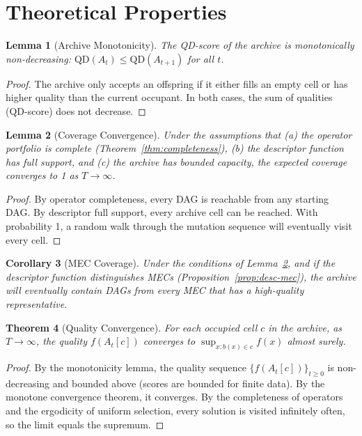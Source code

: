 \documentclass[11pt,a4paper]{article}
\newtheorem{theorem}{Theorem}
\newtheorem{lemma}[theorem]{Lemma}
\newtheorem{corollary}[theorem]{Corollary}
\begin{document}
\section{Theoretical Properties}
\label{app:theory}

\begin{lemma}[Archive Monotonicity]
\label{lem:monotone}
The QD-score of the archive is monotonically non-decreasing: $\text{QD}(A_t) \leq \text{QD}(A_{t+1})$ for all $t$.
\end{lemma}

\begin{proof}
The archive only accepts an offspring if it either fills an empty cell or has higher quality than the current occupant. In both cases, the sum of qualities (QD-score) does not decrease.
\end{proof}

\begin{lemma}[Coverage Convergence]
\label{lem:coverage}
Under the assumptions that (a) the operator portfolio is complete (Theorem~\ref{thm:completeness}), (b) the descriptor function has full support, and (c) the archive has bounded capacity, the expected coverage converges to 1 as $T \to \infty$.
\end{lemma}

\begin{proof}
By operator completeness, every DAG is reachable from any starting DAG. By descriptor full support, every archive cell can be reached. With probability 1, a random walk through the mutation sequence will eventually visit every cell.
\end{proof}

\begin{corollary}[MEC Coverage]
Under the conditions of Lemma~\ref{lem:coverage}, and if the descriptor function distinguishes MECs (Proposition~\ref{prop:desc-mec}), the archive will eventually contain DAGs from every MEC that has a high-quality representative.
\end{corollary}

\begin{theorem}[Quality Convergence]
\label{thm:quality-convergence}
For each occupied cell $c$ in the archive, as $T \to \infty$, the quality $f(A_t[c])$ converges to $\sup_{x: b(x) \in c} f(x)$ almost surely.
\end{theorem}

\begin{proof}
By the monotonicity lemma, the quality sequence $\{f(A_t[c])\}_{t \geq 0}$ is non-decreasing and bounded above (scores are bounded for finite data). By the monotone convergence theorem, it converges. By the completeness of operators and the ergodicity of uniform selection, every solution is visited infinitely often, so the limit equals the supremum.
\end{proof}
\end{document}
